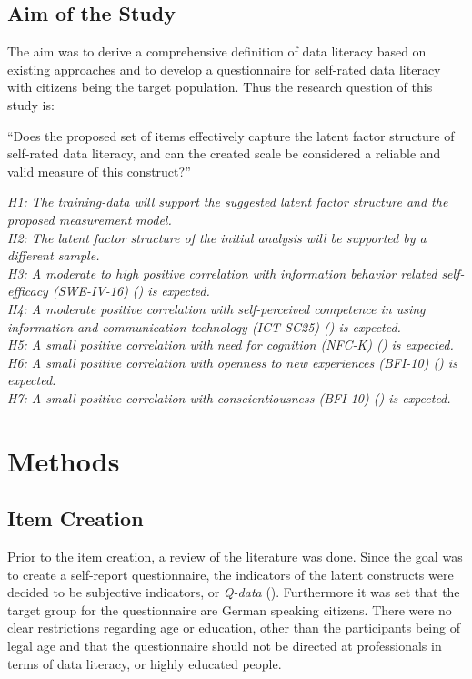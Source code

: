 \documentclass[
  12pt,
  a4paper,
  twoside]{article}
\begin{document}
\subsection{Aim of the Study}\label{aim-of-the-study}

The aim was to derive a comprehensive definition of data literacy based on existing approaches and to develop a questionnaire for self-rated data literacy with citizens being the target population. Thus the research question of this study is:

\noindent ``Does the proposed set of items effectively capture the latent factor structure of self-rated data literacy, and can the created scale be considered a reliable and valid measure of this construct?''

\noindent \textit{H1: The training-data will support the suggested latent factor structure and the proposed measurement model.}\\
\emph{H2: The latent factor structure of the initial analysis will be supported by a different sample.}\\
\emph{H3: A moderate to high positive correlation with information behavior related self-efficacy (SWE-IV-16) () is expected.}\\
\emph{H4: A moderate positive correlation with self-perceived competence in using information and communication technology (ICT-SC25) () is expected.}\\
\emph{H5: A small positive correlation with need for cognition (NFC-K) () is expected.}\\
\emph{H6: A small positive correlation with openness to new experiences (BFI-10) () is expected.}\\
\emph{H7: A small positive correlation with conscientiousness (BFI-10) () is expected.}

\section{Methods}\label{methods}

\subsection{Item Creation}\label{item-creation}

Prior to the item creation, a review of the literature was done. Since the goal was to create a self-report questionnaire, the indicators of the latent constructs were decided to be subjective indicators, or \emph{Q-data} (). Furthermore it was set that the target group for the questionnaire are German speaking citizens. There were no clear restrictions regarding age or education, other than the participants being of legal age and that the questionnaire should not be directed at professionals in terms of data literacy, or highly educated people.
\end{document}
